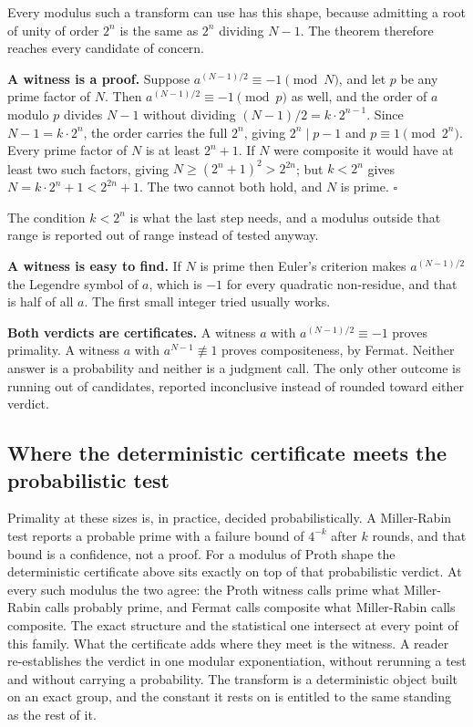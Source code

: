 \documentclass{article}
\begin{document}
Every modulus such a transform can use has this shape, because admitting a root of unity of order \(2^n\) is the same as \(2^n\) dividing \(N-1\). The theorem therefore reaches every candidate of concern.

\textbf{A witness is a proof.} Suppose \(a^{(N-1)/2} \equiv -1 \pmod N\), and let \(p\) be any prime factor of \(N\). Then \(a^{(N-1)/2} \equiv -1 \pmod p\) as well, and the order of \(a\) modulo \(p\) divides \(N-1\) without dividing \((N-1)/2 = k \cdot 2^{n-1}\). Since \(N - 1 = k \cdot 2^n\), the order carries the full \(2^n\), giving \(2^n \mid p-1\) and \(p \equiv 1 \pmod{2^n}\). Every prime factor of \(N\) is at least \(2^n + 1\). If \(N\) were composite it would have at least two such factors, giving \(N \ge (2^n+1)^2 > 2^{2n}\); but \(k < 2^n\) gives \(N = k \cdot 2^n + 1 < 2^{2n} + 1\). The two cannot both hold, and \(N\) is prime. \(\square\)

The condition \(k < 2^n\) is what the last step needs, and a modulus outside that range is reported out of range instead of tested anyway.

\textbf{A witness is easy to find.} If \(N\) is prime then Euler's criterion makes \(a^{(N-1)/2}\) the Legendre symbol of \(a\), which is \(-1\) for every quadratic non-residue, and that is half of all \(a\). The first small integer tried usually works.

\textbf{Both verdicts are certificates.} A witness \(a\) with \(a^{(N-1)/2} \equiv -1\) proves primality. A witness \(a\) with \(a^{N-1} \not\equiv 1\) proves compositeness, by Fermat. Neither answer is a probability and neither is a judgment call. The only other outcome is running out of candidates, reported inconclusive instead of rounded toward either verdict.

\subsection{Where the deterministic certificate meets the probabilistic test}

Primality at these sizes is, in practice, decided probabilistically. A Miller-Rabin test reports a probable prime with a failure bound of \(4^{-k}\) after \(k\) rounds, and that bound is a confidence, not a proof. For a modulus of Proth shape the deterministic certificate above sits exactly on top of that probabilistic verdict. At every such modulus the two agree: the Proth witness calls prime what Miller-Rabin calls probably prime, and Fermat calls composite what Miller-Rabin calls composite. The exact structure and the statistical one intersect at every point of this family. What the certificate adds where they meet is the witness. A reader re-establishes the verdict in one modular exponentiation, without rerunning a test and without carrying a probability. The transform is a deterministic object built on an exact group, and the constant it rests on is entitled to the same standing as the rest of it.
\end{document}

